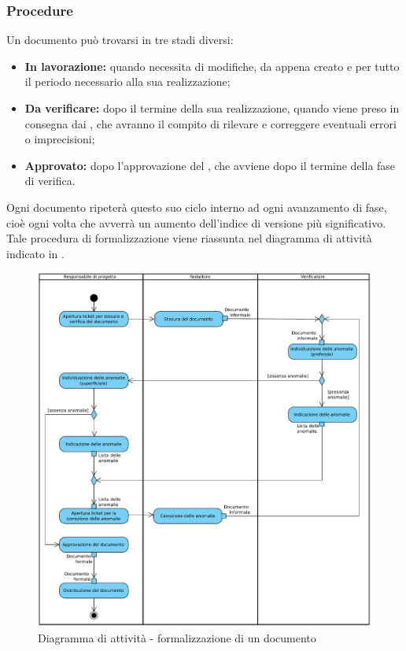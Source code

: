 \subsubsection{Procedure}
Un documento può trovarsi in tre stadi diversi:
\begin{itemize}
\item \textbf{In lavorazione:} quando necessita di modifiche, da appena creato e per tutto il periodo necessario alla sua realizzazione;
\item \textbf{Da verificare:} dopo il termine della sua realizzazione, quando viene preso in consegna dai \rVs, che avranno il compito di rilevare e correggere eventuali errori o imprecisioni;
\item \textbf{Approvato:} dopo l'approvazione del \rRP, che avviene dopo il termine della fase di verifica.
\end{itemize}
Ogni documento ripeterà questo suo ciclo interno ad ogni avanzamento di fase, cioè ogni volta che avverrà un aumento dell'indice di versione più significativo.
Tale procedura di formalizzazione viene riassunta nel diagramma di attività indicato in .
\begin{figure}[H]
\centering
\includegraphics[width=14cm]{../immagini/formalizzazioneDocumenti.pdf}
\caption{Diagramma di attività - formalizzazione di un documento}
\label{fig:formalizzazioneDocumenti}
\end{figure}
